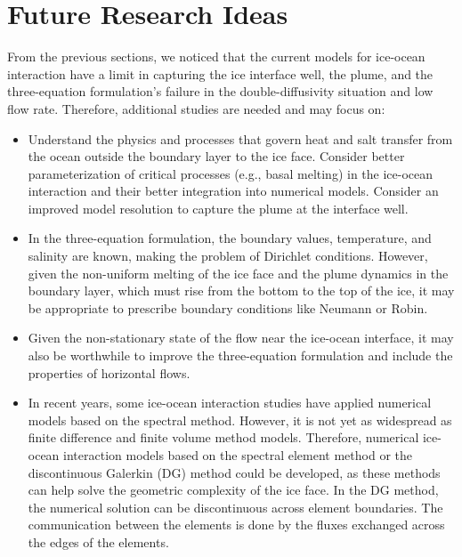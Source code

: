 \documentclass[11pt,a4paper]{article}
\begin{document}
    
    \section{Future Research Ideas}
    
    From the previous sections, we noticed that the current models for ice-ocean interaction have a limit in capturing the ice interface well, the plume, and the three-equation formulation's failure in the double-diffusivity situation and low flow rate. Therefore, additional studies are needed and may focus on:
    
    \begin{itemize}
        \item Understand the physics and processes that govern heat and salt transfer from the ocean outside the boundary layer to the ice face. Consider better parameterization of critical processes (e.g., basal melting) in the ice-ocean interaction and their better integration into numerical models. Consider an improved model resolution to capture the plume at the interface well.
        
        \item In the three-equation formulation, the boundary values, temperature, and salinity are known, making the problem of Dirichlet conditions. However, given the non-uniform melting of the ice face and the plume dynamics in the boundary layer, which must rise from the bottom to the top of the ice, it may be appropriate to prescribe boundary conditions like Neumann or Robin.
        
        \item Given the non-stationary state of the flow near the ice-ocean interface, it may also be worthwhile to improve the three-equation formulation and include the properties of horizontal flows.
        
        \item In recent years, some ice-ocean interaction studies have applied numerical models based on the spectral method. However, it is not yet as widespread as finite difference and finite volume method models. Therefore, numerical ice-ocean interaction models based on the spectral element method or the discontinuous Galerkin (DG) method could be developed, as these methods can help solve the geometric complexity of the ice face. In the DG method, the numerical solution can be discontinuous across element boundaries. The communication between the elements is done by the fluxes exchanged across the edges of the elements.
    \end{itemize}
    
   

	

	
	
	
\end{document}
